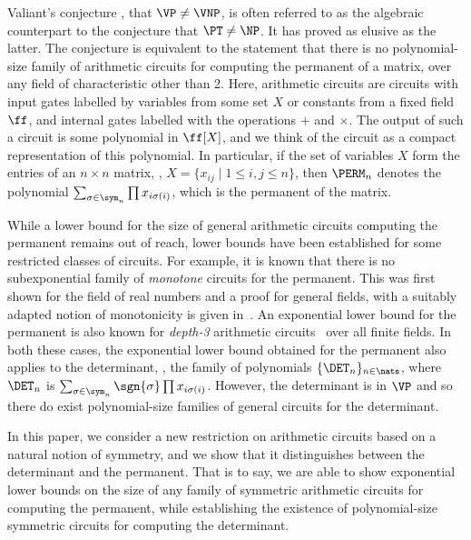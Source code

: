 \documentclass{toc}
\begin{document}
Valiant's conjecture \cite{Valiant79}, that $\VP\neq\VNP$, is often referred to
as the algebraic counterpart to the conjecture that $\PT\neq\NP$. It has proved
as elusive as the latter. The conjecture is equivalent to the statement that
there is no polynomial-size family of arithmetic circuits for computing the
permanent of a matrix, over any field of characteristic other than 2. Here,
arithmetic circuits are circuits with input gates labelled by variables from
some set $X$ or constants from a fixed field $\ff$, and internal gates labelled
with the operations $+$ and $\times$. The output of such a circuit is some
polynomial in $\ff[X]$, and we think of the circuit as a compact representation
of this polynomial. In particular, if the set of variables $X$ form the entries
of an $n\times n$ matrix, \ie, $X = \{x_{ij} \mid 1\leq i,j \leq n\}$, then
$\PERM_n$ denotes the polynomial $\sum_{\sigma \in \sym_n}\prod x_{i\sigma(i)}$,
which is the permanent of the matrix.

While a lower bound for the size of general arithmetic circuits computing the
permanent remains out of reach, lower bounds have been established for some
restricted classes of circuits. For example, it is known that there is no
subexponential family of \emph{monotone} circuits for the permanent. This was
first shown for the field of real numbers \cite{JerrumS82} and a proof for
general fields, with a suitably adapted notion of monotonicity is given
in~\cite{KayalS14}. An exponential lower bound for the permanent is also known
for \emph{depth-3} arithmetic circuits~\cite{GK98} over all finite fields. In
both these cases, the exponential lower bound obtained for the permanent also
applies to the determinant, \ie, the family of polynomials $\{\DET_n\}_{n \in
  \nats}$, where $\DET_n$ is $\sum_{\sigma \in \sym_n} \sgn{\sigma}\prod
x_{i\sigma(i)}$. However, the determinant is in $\VP$ and so there do exist
polynomial-size families of general circuits for the determinant.

In this paper, we consider a new restriction on arithmetic circuits based on a
natural notion of symmetry, and we show that it distinguishes between the
determinant and the permanent. That is to say, we are able to show exponential
lower bounds on the size of any family of symmetric arithmetic circuits for
computing the permanent, while establishing the existence of polynomial-size
symmetric circuits for computing the determinant.
\end{document}
